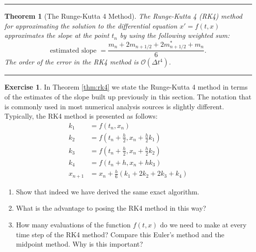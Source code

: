 \documentclass[
]{book}
\providecommand{\tightlist}{%
  \setlength{\itemsep}{0pt}\setlength{\parskip}{0pt}}
\newtheorem{theorem}{Theorem}[chapter]
\theoremstyle{definition}
\theoremstyle{definition}
\theoremstyle{definition}
\newtheorem{exercise}{Exercise}[chapter]
\theoremstyle{remark}
\begin{document}
\begin{center}\rule{0.5\linewidth}{0.5pt}\end{center}

\begin{theorem}[The Runge-Kutta 4 Method]
\protect\hypertarget{thm:rk4}{}{\label{thm:rk4} {} }The Runge-Kutta 4 (RK4) method for approximating the solution to the differential equation \(x' = f(t,x)\) approximates the slope at the point \(t_n\) by using the following weighted sum:
\[ \text{estimated slope } = \frac{m_n + 2 m_{n+1/2} + 2 m_{n+1/2}^* + m_n}{6}. \]
The order of the error in the RK4 method is \(\mathcal{O}(\Delta t^4)\).
\end{theorem}

\begin{center}\rule{0.5\linewidth}{0.5pt}\end{center}

\begin{exercise}
\protect\hypertarget{exr:unnamed-chunk-456}{}{\label{exr:unnamed-chunk-456} }In Theorem \ref{thm:rk4} we state the Runge-Kutta 4 method in terms of the estimates of the slope built up previously in this section. The notation that is commonly used in most numerical analysis sources is slightly different. Typically, the RK4 method is presented as follows:
\[\begin{aligned} 
        k_1 &= f(t_n, x_n) \\
        k_2 &= f(t_n + \frac{h}{2}, x_n + \frac{h}{2} k_1) \\
        k_3 &= f(t_n + \frac{h}{2}, x_n + \frac{h}{2} k_2) \\
        k_4 &= f(t_n + h, x_n + h k_3) \\
        x_{n+1} &= x_n + \frac{h}{6} \left( k_1 + 2 k_2 + 2 k_3 + k_4 \right)
\end{aligned}\]

\begin{enumerate}
\def\labelenumi{\alph{enumi}.}
\tightlist
\item
  Show that indeed we have derived the same exact algorithm.\\
\item
  What is the advantage to posing the RK4 method in this way?
\item
  How many evaluations of the function \(f(t,x)\) do we need to make at every time step of the RK4 method? Compare this Euler's method and the midpoint method. Why is this important?
\end{enumerate}
\end{exercise}
\end{document}

